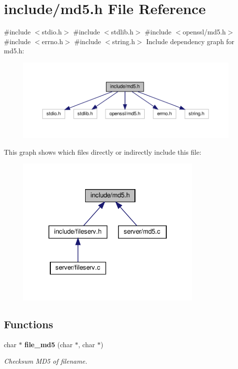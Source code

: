 \section{include/md5.h File Reference}
\label{md5_8h}
{\ttfamily \#include $<$stdio.\+h$>$}\newline
{\ttfamily \#include $<$stdlib.\+h$>$}\newline
{\ttfamily \#include $<$openssl/md5.\+h$>$}\newline
{\ttfamily \#include $<$errno.\+h$>$}\newline
{\ttfamily \#include $<$string.\+h$>$}\newline
Include dependency graph for md5.\+h\+:\nopagebreak
\begin{figure}[H]
\begin{center}
\leavevmode
\includegraphics[width=350pt]{md5_8h__incl}
\end{center}
\end{figure}
This graph shows which files directly or indirectly include this file\+:
\nopagebreak
\begin{figure}[H]
\begin{center}
\leavevmode
\includegraphics[width=262pt]{md5_8h__dep__incl}
\end{center}
\end{figure}
\subsection*{Functions}
\begin{DoxyCompactItemize}
\item 
char $\ast$ \textbf{ file\+\_\+md5} (char $\ast$, char $\ast$)
\begin{DoxyCompactList}\small\item\em Checksum M\+D5 of filename. \end{DoxyCompactList}\end{DoxyCompactItemize}


